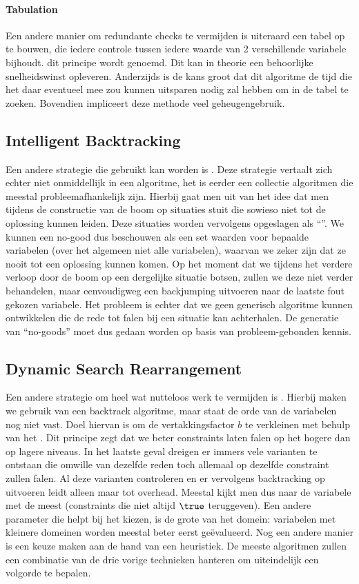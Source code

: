 \paragraph{Tabulation}
Een andere manier om redundante checks te vermijden is uiteraard een tabel op te bouwen, die iedere controle tussen iedere waarde van 2 verschillende variabele bijhoudt. dit principe wordt  genoemd. Dit kan in theorie een behoorlijke snelheidswinst opleveren. Anderzijds is de kans groot dat dit algoritme de tijd die het daar eventueel mee zou kunnen uitsparen nodig zal hebben om in de tabel te zoeken. Bovendien impliceert deze methode veel geheugengebruik.
\subsection{Intelligent Backtracking}
Een andere strategie die gebruikt kan worden is . Deze strategie vertaalt zich echter niet onmiddellijk in een algoritme, het is eerder een collectie algoritmen die meestal probleemafhankelijk zijn. Hierbij gaat men uit van het idee dat men tijdens de constructie van de boom op situaties stuit die sowieso niet tot de oplossing kunnen leiden. Deze situaties worden vervolgens opgeslagen als ``''. We kunnen een no-good dus beschouwen als een set waarden voor bepaalde variabelen (over het algemeen niet alle variabelen), waarvan we zeker zijn dat ze nooit tot een oplossing kunnen komen. Op het moment dat we tijdens het verdere verloop door de boom op een dergelijke situatie botsen, zullen we deze niet verder behandelen, maar eenvoudigweg een backjumping uitvoeren naar de laatste fout gekozen variabele. Het probleem is echter dat we geen generisch algoritme kunnen ontwikkelen die de rede tot falen bij een situatie kan achterhalen. De generatie van ``no-goods'' moet dus gedaan worden op basis van probleem-gebonden kennis.
\subsection{Dynamic Search Rearrangement}
\label{sss:dynamicSearchRearrangement}
Een andere strategie om heel wat nutteloos werk te vermijden is . Hierbij maken we gebruik van een backtrack algoritme, maar staat de orde van de variabelen nog niet vast. Doel hiervan is om de vertakkingsfactor $b$ te verkleinen met behulp van het . Dit principe zegt dat we beter constraints laten falen op het hogere dan op lagere niveaus. In het laatste geval dreigen er immers vele varianten te ontstaan die omwille van dezelfde reden toch allemaal op dezelfde constraint zullen falen. Al deze varianten controleren en er vervolgens backtracking op uitvoeren leidt alleen maar tot overhead. Meestal kijkt men dus naar de variabele met de meest  (constraints die niet altijd $\true$ teruggeven). Een andere parameter die helpt bij het kiezen, is de grote van het domein: variabelen met kleinere domeinen worden meestal beter eerst ge\"evalueerd. Nog een andere manier is een keuze maken aan de hand van een heuristiek. De meeste algoritmen zullen een combinatie van de drie vorige technieken hanteren om uiteindelijk een volgorde te bepalen.

